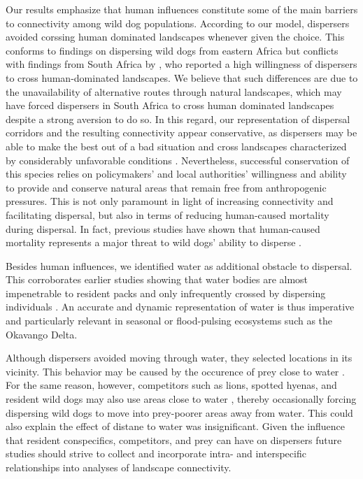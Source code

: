 \documentclass[abstract=on,10pt,a4paper,bibliography=totocnumbered]{article}
\begin{document}
Our results emphasize that human influences constitute some of the main barriers
to connectivity among wild dog populations. According to our model, dispersers
avoided corssing human dominated landscapes whenever given the
choice. This conforms to findings on dispersing wild dogs
from eastern Africa \citep{Masenga.2016, Oneill.2020} but conflicts with
findings from South Africa by \cite{DaviesMostert.2012}, who reported a high
willingness of dispersers to cross human-dominated landscapes. We believe that
such differences are due to the unavailability of alternative routes through
natural landscapes, which may have forced dispersers in South Africa to cross
human dominated landscapes despite a strong aversion to do so. In this regard,
our representation of dispersal corridors and the resulting connectivity appear
conservative, as dispersers may be able to make the best out of a bad situation
and cross landscapes characterized by considerably unfavorable conditions
\citep{Palomares.2000, Elliot.2014}. Nevertheless, successful conservation of
this species relies on policymakers' and local authorities' willingness and
ability to provide and conserve natural areas that remain free from
anthropogenic pressures. This is not only paramount in light of increasing
connectivity and facilitating dispersal, but also in terms of reducing
human-caused mortality during dispersal. In fact, previous studies have shown
that human-caused mortality represents a major threat to wild dogs' ability to
disperse \citep{Woodroffe.2019, Cozzi.2020}.

Besides human influences, we identified water as additional obstacle to
dispersal. This corroborates earlier studies showing that water bodies are
almost impenetrable to resident packs \citep{Abrahms.2017} and only infrequently
crossed by dispersing individuals \citep{Cozzi.2020}. An accurate and dynamic
representation of water is thus imperative and particularly relevant in seasonal
or flood-pulsing ecosystems such as the Okavango Delta.

Although dispersers avoided moving through water, they selected locations in its
vicinity. This behavior may be caused by the occurence of prey close to water
\citep{Bonyongo.2005}. For the same reason, however, competitors such as lions,
spotted hyenas, and resident wild dogs may also use areas close to water
\citep{Valeix.2010}, thereby occasionally forcing dispersing wild dogs to move
into prey-poorer areas away from water. This could also explain the effect of
distane to water was insignificant. Given
the influence that resident conspecifics, competitors, and prey can have on
dispersers \citep{Cozzi.2018, Armansin.2019} future studies should strive to
collect and incorporate intra- and interspecific relationships into analyses of
landscape connectivity.
\end{document}
